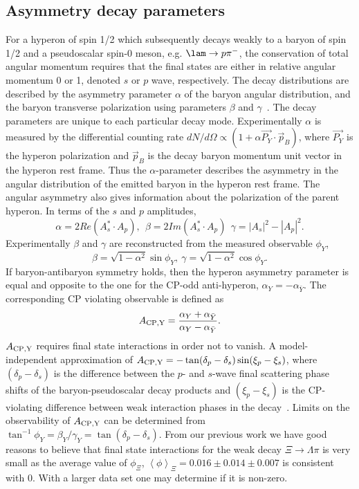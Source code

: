 \subsection{Asymmetry decay parameters}
For a hyperon of spin 1/2 which subsequently decays weakly to a baryon of spin 1/2 and a pseudoscalar spin-0 meson, e.g. $\lam \rightarrow p \pi^{-}$, the conservation of total angular momentum requires that the final states are either in relative angular momentum 0 or 1, denoted $s$ or $p$ wave, respectively. The decay distributions are described by the asymmetry parameter $\alpha$ of the baryon angular distribution, and the baryon transverse polarization using parameters $\beta$ and $\gamma$~\cite{MS08}. The decay parameters are unique to each particular decay mode. Experimentally $\alpha$ is measured by the differential counting rate $dN/d\Omega \propto(1+\alpha \vec{P_{Y}} \cdot \vec{p}_{B})$, where $\vec{P_Y}$ is the hyperon polarization and $\vec{p}_{B}$ is the decay baryon momentum unit vector in the hyperon rest frame. Thus the $\alpha$-parameter describes the asymmetry in the angular distribution of the emitted baryon in the hyperon rest frame. The angular asymmetry also gives information about the polarization of the parent hyperon. In terms of the $s$ and $p$ amplitudes, 
\begin{equation}
    \alpha = 2Re(A_s^*\cdot A_{p} ), \ \ \beta=2Im(A_s^*\cdot A_{p}) \ \ \gamma=|A_{s}|^{2}-|A_p |^2.
\end{equation}
Experimentally $\beta$ and $\gamma$ are reconstructed from the measured observable $\phi_{Y}$,
\begin{equation}
    \label{betagamma}
    \beta=\sqrt{1-\alpha^{2}}\sin\phi_{Y}, \ \gamma = \sqrt{1-\alpha^2}\cos\phi_{Y}.
\end{equation}
If baryon-antibaryon symmetry holds, then the hyperon asymmetry parameter is equal and opposite to the one for the CP-odd anti-hyperon, $\alpha_{Y}=-\alpha_{\bar{Y}}$. The corresponding CP violating observable is defined as 
\begin{equation}
    \label{alpha}
    A_{\rm CP,Y} = \frac{\alpha_{Y} + \alpha_{\bar{Y}}}{\alpha_{Y}-\alpha_{\bar{Y}}}.
\end{equation}
$A_{\rm CP, Y}$ requires final state interactions in order not to vanish. A model-independent approximation of $A_{\rm CP, Y} = -\tan(\delta_p -\delta_s)\sin(\xi_p- \xi_s)$, where $(\delta_p -\delta_s)$ is the difference between the $p$- and $s$-wave final scattering phase shifts of the baryon-pseudoscalar decay products and $(\xi_p- \xi_s)$ is the CP-violating difference between weak interaction phases in the decay~\cite{MH04}. Limits on the observability of $A_{\rm CP, Y}$ can be determined from  $\tan^{-1}\phi_{Y}=\beta_{Y}/\gamma_{Y}=\tan(\delta_p -\delta_s)$. From our previous work we have good reasons to believe that final state interactions for the weak decay $\Xi\to\Lambda\pi$ is very small as the average value of $\phi_{\Xi}$, $\left<\phi\right>_{\Xi}=0.016\pm0.014\pm0.007$ is consistent with 0. With a larger data set one may determine if it is non-zero.
